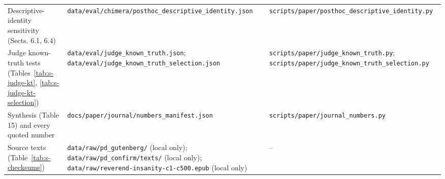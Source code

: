 \documentclass[11pt]{article}
\begin{document}
{\begin{longtable}{p{3.6cm}p{7.0cm}p{4.4cm}}
Descriptive-identity sensitivity (Sects. 6.1, 6.4) & \nolinkurl{data/eval/chimera/posthoc_descriptive_identity.json} & \nolinkurl{scripts/paper/posthoc_descriptive_identity.py} \\
Judge known-truth tests (Tables~\ref{tab:s-judge-kt}, \ref{tab:s-judge-kt-selection}) & \nolinkurl{data/eval/judge_known_truth.json}; \nolinkurl{data/eval/judge_known_truth_selection.json} & \nolinkurl{scripts/paper/judge_known_truth.py}; \nolinkurl{scripts/paper/judge_known_truth_selection.py} \\
Synthesis (Table 15) and every quoted number & \nolinkurl{docs/paper/journal/numbers_manifest.json} & \nolinkurl{scripts/paper/journal_numbers.py} \\
Source texts (Table~\ref{tab:s-checksums}) & \nolinkurl{data/raw/pd_gutenberg/} (local only); \nolinkurl{data/raw/pd_confirm/texts/} (local only); \nolinkurl{data/raw/reverend-insanity-c1-c500.epub} (local only) & -- \\
\bottomrule\end{longtable}}
\end{document}
